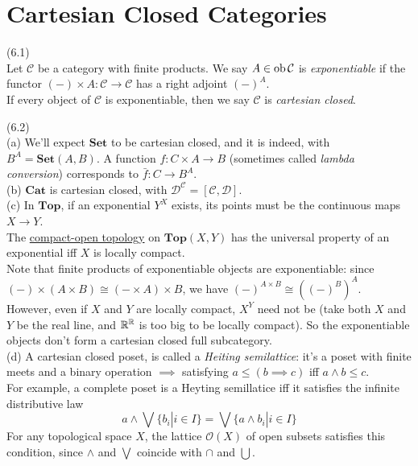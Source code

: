\documentclass[a4paper]{article}
\begin{document}
\newpage

\section{Cartesian Closed Categories}

\begin{defi} (6.1)\\
    Let $\mathcal{C}$ be a category with finite products. We say $A \in \operatorname{ob}\mathcal{C}$ is \emph{exponentiable} if the functor $(-) \times A: \mathcal{C} \to \mathcal{C}$ has a right adjoint $(-)^A$.\\
    If every object of $\mathcal{C}$ is exponentiable, then we say $\mathcal{C}$ is \emph{cartesian closed}.
\end{defi}

\begin{eg} (6.2)\\
    (a) We'll expect $\mathbf{Set}$ to be cartesian closed, and it is indeed, with $B^A = \mathbf{Set}(A,B)$. A function $f:C \times A \to B$ (sometimes called \emph{lambda conversion}) corresponds to $\bar{f}: C \to B^A$.\\
    (b) $\mathbf{Cat}$ is cartesian closed, with $\mathcal{D}^\mathcal{C} = [\mathcal{C},\mathcal{D}]$.\\
    (c) In $\mathbf{Top}$, if an exponential $Y^X$ exists, its points must be the continuous maps $X \to Y$.\\
    The \href{https://en.wikipedia.org/wiki/Compact-open_topology}{compact-open topology} on $\mathbf{Top}(X,Y)$ has the universal property of an exponential iff $X$ is locally compact.\\
    Note that finite products of exponentiable objects are exponentiable: since $(-) \times (A \times B) \cong (- \times A) \times B$, we have $(-)^{A \times B} \cong ((-)^B)^A$.\\
    However, even if $X$ and $Y$ are locally compact, $X^Y$ need not be (take both $X$ and $Y$ be the real line, and $\mathbb{R}^{\mathbb{R}}$ is too big to be locally compact). So the exponentiable objects don't form a cartesian closed full subcategory.\\
    (d) A cartesian closed poset, is called a \emph{Heiting semilattice}: it's a poset with finite meets and a binary operation $\implies$ satisfying $a \leq (b \implies c)$ iff $a \wedge b \leq c$.\\
    For example, a complete poset is a Heyting semillatice iff it satisfies the infinite distributive law
    $$a \wedge \bigvee \{b_i | i \in I\} = \bigvee \{a \wedge b_i | i \in I\}$$
    For any topological space $X$, the lattice $\mathcal{O}(X)$ of open subsets satisfies this condition, since $\wedge$ and $\bigvee$ coincide with $\cap$ and $\bigcup$.
\end{eg}
\end{document}

